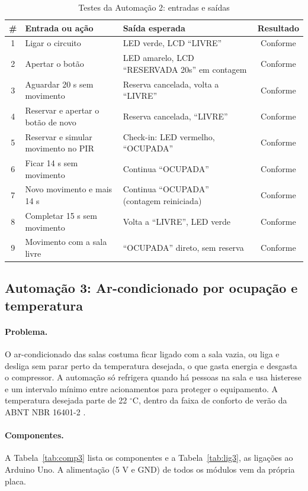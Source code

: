 \documentclass[12pt]{article}
\newcommand{\conf}{Conforme}
\begin{document}
\begin{table}[!htb]
\centering
\caption{Testes da Automação 2: entradas e saídas}\label{tab:teste2}
\small
\begin{tabularx}{\textwidth}{cXXc}
\toprule
\# & Entrada ou ação & Saída esperada & Resultado \\
\midrule
1 & Ligar o circuito & LED verde, LCD ``LIVRE'' & \conf \\
2 & Apertar o botão & LED amarelo, LCD ``RESERVADA 20s'' em contagem & \conf \\
3 & Aguardar 20 s sem movimento & Reserva cancelada, volta a ``LIVRE'' & \conf \\
4 & Reservar e apertar o botão de novo & Reserva cancelada, ``LIVRE'' & \conf \\
5 & Reservar e simular movimento no PIR & Check-in: LED vermelho, ``OCUPADA'' & \conf \\
6 & Ficar 14 s sem movimento & Continua ``OCUPADA'' & \conf \\
7 & Novo movimento e mais 14 s & Continua ``OCUPADA'' (contagem reiniciada) & \conf \\
8 & Completar 15 s sem movimento & Volta a ``LIVRE'', LED verde & \conf \\
9 & Movimento com a sala livre & ``OCUPADA'' direto, sem reserva & \conf \\
\bottomrule
\end{tabularx}
\end{table}



\subsection{Automação 3: Ar-condicionado por ocupação e temperatura}\label{sub:a3}

\paragraph{Problema.} O ar-condicionado das salas costuma ficar ligado com a sala vazia, ou liga e desliga sem parar perto da temperatura desejada, o que gasta energia e desgasta o compressor. A automação só refrigera quando há pessoas na sala e usa histerese e um intervalo mínimo entre acionamentos para proteger o equipamento. A temperatura desejada parte de 22 $^\circ$C, dentro da faixa de conforto de verão da ABNT NBR 16401-2 \cite{abnt16401}.

\paragraph{Componentes.} A Tabela~\ref{tab:comp3} lista os componentes e a Tabela~\ref{tab:lig3}, as ligações ao Arduino Uno. A alimentação (5 V e GND) de todos os módulos vem da própria placa.
\end{document}
